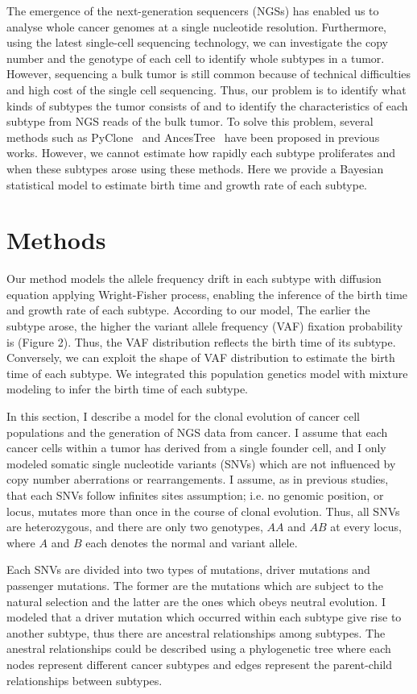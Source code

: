 \documentclass[12pt]{article}
\begin{document}
The emergence of the next-generation sequencers (NGSs) has enabled us to analyse whole cancer genomes at a single nucleotide resolution. Furthermore, using the latest single-cell sequencing technology, we can investigate the copy number and the genotype of each cell to identify whole subtypes in a tumor. However, sequencing a bulk tumor is still common because of technical difficulties and high cost of the single cell sequencing. Thus, our problem is to identify what kinds of subtypes the tumor consists of and to identify the characteristics of each subtype from NGS reads of the bulk tumor. To solve this problem, several methods such as PyClone~\cite{roth2014pyclone} and AncesTree~\cite{el2015reconstruction} have been proposed in previous works. However, we cannot estimate how rapidly each subtype proliferates and when these subtypes arose using these methods. Here we provide a Bayesian statistical model to estimate birth time and growth rate of each subtype.

\section{Methods}
Our method models the allele frequency drift in each subtype with diffusion equation applying Wright-Fisher process, enabling the inference of the birth time and growth rate of each subtype. According to our model, The earlier the subtype arose, the higher the variant allele frequency (VAF) fixation probability is (Figure 2). Thus, the VAF distribution reflects the birth time of its subtype. Conversely, we can exploit the shape of VAF distribution to estimate the birth time of each subtype. We integrated this population genetics model with mixture modeling to infer the birth time of each subtype.

In this section, I describe a model for the clonal evolution of cancer cell populations and the generation of NGS data from cancer.
I assume that each cancer cells within a tumor has derived from a single founder cell, and I only modeled somatic single nucleotide variants (SNVs) which are not influenced by copy number aberrations or rearrangements. I assume, as in previous studies, that each SNVs follow infinites sites assumption; i.e. no genomic position, or locus, mutates more than once in the course of clonal evolution. Thus, all SNVs are heterozygous, and there are only two genotypes, $AA$ and $AB$ at every locus, where $A$ and $B$ each denotes the normal and variant allele.

Each SNVs are divided into two types of mutations, driver mutations and passenger mutations. The former are the mutations which are subject to the natural selection and the latter are the ones which obeys neutral evolution. I modeled that a driver mutation which occurred within each subtype give rise to another subtype, thus there are ancestral relationships among subtypes. The anestral relationships could be described using a phylogenetic tree where each nodes represent different cancer subtypes and edges represent the parent-child relationships between subtypes.
\end{document}
